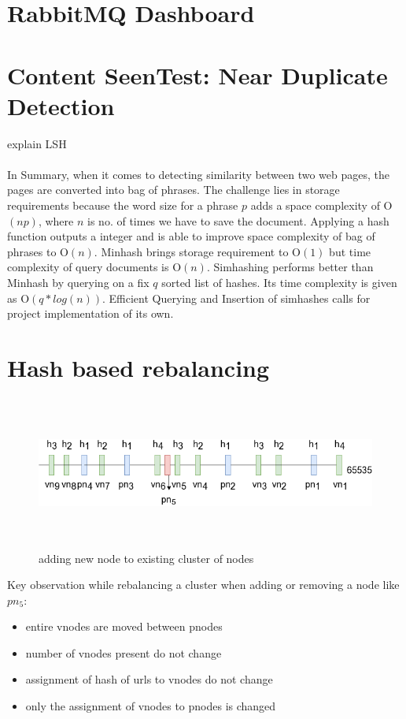 \section{RabbitMQ Dashboard}

\pagebreak

\section{Content SeenTest: Near Duplicate Detection}\label{handle_dedupe}
explain LSH
\\
\\
\noindent
In Summary, when it comes to detecting similarity between two web pages, the pages are converted into
bag of phrases. The challenge lies in storage requirements because the word size for a phrase $p$ adds
a space complexity of O$(np)$, where $n$ is no. of times we have to save the document. Applying a hash
function outputs a integer and is able to improve space complexity of bag of phrases to O$(n)$.
Minhash\cite{dedupe} brings storage requirement to O$(1)$ but time complexity of query documents is
O$(n)$. Simhashing\cite{dedupe} performs better than Minhash by querying on a fix $q$ sorted list of
hashes. Its time complexity is given as O$(q * log(n))$. Efficient Querying and Insertion of simhashes
calls for project implementation of its own.

\pagebreak

\section{Hash based rebalancing}
\begin{figure}[h!]
  \centering
  \includegraphics[width=12cm,height=5cm,keepaspectratio]{../media/crawler/addingnode.png}
  \caption{adding new node to existing cluster of nodes}
  \label{fig:addingnode}
\end{figure}

\noindent
Key observation while rebalancing a cluster when adding or removing a node like $pn_5$:
\begin{itemize}
  \item entire vnodes are moved between pnodes
  \item number of vnodes present do not change 
  \item assignment of hash of urls to vnodes do not change
  \item only the assignment of vnodes to pnodes is changed
\end{itemize}

